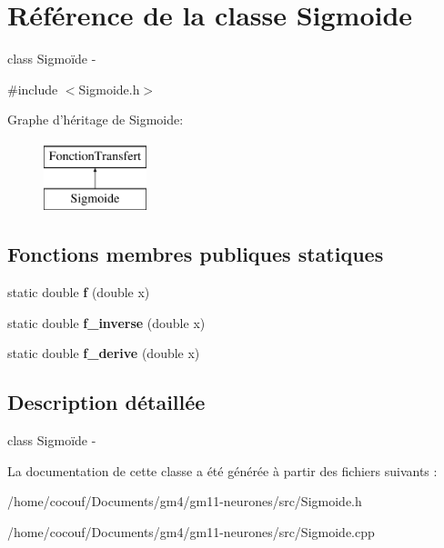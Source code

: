 \hypertarget{classSigmoide}{
\section{Référence de la classe Sigmoide}
\label{classSigmoide}
}


class Sigmoïde -\/  




{\ttfamily \#include $<$Sigmoide.h$>$}

Graphe d'héritage de Sigmoide:\begin{figure}[H]
\begin{center}
\leavevmode
\includegraphics[height=2.000000cm]{classSigmoide}
\end{center}
\end{figure}
\subsection*{Fonctions membres publiques statiques}
\begin{DoxyCompactItemize}
\item 
\hypertarget{classSigmoide_a3bf746fe163bdd5180fb2f3cbe95ecc3}{
static double {\bfseries f} (double x)}
\label{classSigmoide_a3bf746fe163bdd5180fb2f3cbe95ecc3}

\item 
\hypertarget{classSigmoide_accaa035158e86d4f22cdc5b5db3ae3b3}{
static double {\bfseries f\_\-inverse} (double x)}
\label{classSigmoide_accaa035158e86d4f22cdc5b5db3ae3b3}

\item 
\hypertarget{classSigmoide_ae3d4858677b26fabebade43d37874a82}{
static double {\bfseries f\_\-derive} (double x)}
\label{classSigmoide_ae3d4858677b26fabebade43d37874a82}

\end{DoxyCompactItemize}


\subsection{Description détaillée}
class Sigmoïde -\/ 

La documentation de cette classe a été générée à partir des fichiers suivants :\begin{DoxyCompactItemize}
\item 
/home/cocouf/Documents/gm4/gm11-\/neurones/src/Sigmoide.h\item 
/home/cocouf/Documents/gm4/gm11-\/neurones/src/Sigmoide.cpp\end{DoxyCompactItemize}
